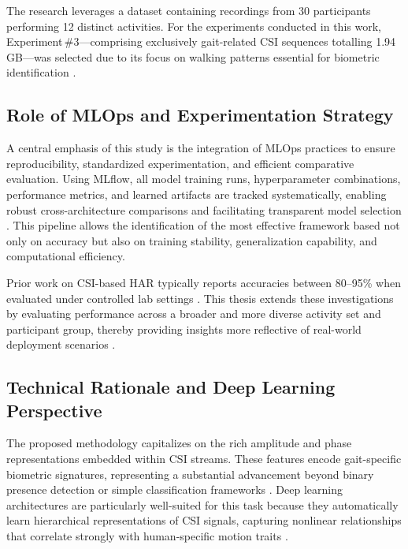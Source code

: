 The research leverages a dataset containing recordings from 30 participants performing 12 distinct activities. For the experiments conducted in this work, Experiment\,\#3—comprising exclusively gait-related CSI sequences totalling 1.94\,GB—was selected due to its focus on walking patterns essential for biometric identification \parencite{alsaify2020losnlos}.

\subsection{Role of MLOps and Experimentation Strategy}

A central emphasis of this study is the integration of MLOps practices to ensure reproducibility, standardized experimentation, and efficient comparative evaluation. Using MLflow, all model training runs, hyperparameter combinations, performance metrics, and learned artifacts are tracked systematically, enabling robust cross-architecture comparisons and facilitating transparent model selection \parencite{castiglioni2023whofi}. This pipeline allows the identification of the most effective framework based not only on accuracy but also on training stability, generalization capability, and computational efficiency.

Prior work on CSI-based HAR typically reports accuracies between 80--95\% when evaluated under controlled lab settings \parencite{zhuravchak2022wifi_har}. This thesis extends these investigations by evaluating performance across a broader and more diverse activity set and participant group, thereby providing insights more reflective of real-world deployment scenarios \parencite{varga2024mitigating}. 

\subsection{Technical Rationale and Deep Learning Perspective}

The proposed methodology capitalizes on the rich amplitude and phase representations embedded within CSI streams. These features encode gait-specific biometric signatures, representing a substantial advancement beyond binary presence detection or simple classification frameworks \parencite{avola2025transformercsi}. Deep learning architectures are particularly well-suited for this task because they automatically learn hierarchical representations of CSI signals, capturing nonlinear relationships that correlate strongly with human-specific motion traits \parencite{wang2019csiid}. 

